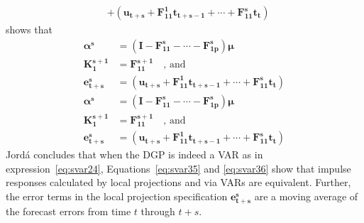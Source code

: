 \documentclass[a4paper,11pt,listof=nochaptergap,oneside,pointednumbers,bibtotoc,bigheadings,liststotoc]{scrbook}
\theoremstyle{mysatz}
\theoremstyle{mydefinition}
\theoremstyle{mybemerkung}
\newcommand{\vect}[1]{\boldsymbol{\mathbf{#1}}}
\begin{document}
\begin{enumerate}
\begin{equation}
\begin{split}
		& + (\vect{u_{t+s}} + \vect{F_{11}^1}\vect{t_{t+s-1}} + \cdots + \vect{F_{11}^s}\vect{t_{t}})
	\end{split}								
	\end{equation}	
	shows that 
			\begin{equation} \label{eq:svar36}
	\begin{split}
		\vect{\alpha^s} & = (\vect{I} - \vect{F_{11}^s} - \cdots - \vect{F_{1p}^s})\vect{\mu} \\
		\vect{K_1^{s+1}} & = \vect{F_{11}^{s+1}} \quad \text{, and} \\
		\vect{e_{t+s}^s} & = (\vect{u_{t+s}} + \vect{F_{11}^1}\vect{t_{t+s-1}} + \cdots + \vect{F_{11}^s}\vect{t_{t}})
	\end{split}								
	\end{equation}	\begin{equation} \label{eq:svar36}
	\begin{split}
		\vect{\alpha^s} & = (\vect{I} - \vect{F_{11}^s} - \cdots - \vect{F_{1p}^s})\vect{\mu} \\
		\vect{K_1^{s+1}} & = \vect{F_{11}^{s+1}} \quad \text{, and} \\
		\vect{e_{t+s}^s} & = (\vect{u_{t+s}} + \vect{F_{11}^1}\vect{t_{t+s-1}} + \cdots + \vect{F_{11}^s}\vect{t_{t}})
	\end{split}								
	\end{equation}	
	Jordá concludes that when the DGP is indeed a VAR as in expression~\ref{eq:svar24}, Equations~\ref{eq:svar35} and \ref{eq:svar36} show that impulse responses calculated by local projections and via VARs are equivalent. Further, the error terms in the local projection specification $\vect{e_{t+s}^s}$ are a moving average of the forecast errors from time $t$ through $t+s$.
\end{enumerate}

\end{document}
